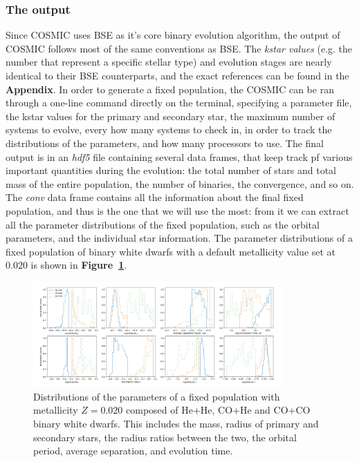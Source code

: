 \subsubsection{The output}
Since COSMIC uses BSE as it’s core binary evolution algorithm, the output of COSMIC follows most of the same conventions as BSE. The \textit{kstar values} (e.g. the number that represent a specific stellar type) and evolution stages are nearly identical to their BSE counterparts, and the exact references can be found in the \textbf{Appendix}.
In order to generate a fixed population, the COSMIC can be ran through a one-line command directly on the terminal, specifying a parameter file, the kstar values for the primary and secondary star, the maximum number of systems to evolve, every how many systems to check in, in order to track the distributions of the parameters, and how many processors to use.
The final output is in an \textit{hdf5} file containing several data frames, that keep track pf various important quantities during the evolution: the total number of stars and total mass of the entire population, the number of binaries, the convergence, and so on. 
The \textit{conv} data frame contains all the information about the final fixed population, and thus is the one that we will use the most: from it we can extract all the parameter distributions of the fixed population, such as the orbital parameters, and the individual star information.
The parameter distributions of a fixed population of binary white dwarfs with a default metallicity value set at $0.020$ is shown in \textbf{Figure~\ref{fig: first fixed pop distributions}}.
\begin{figure}[ht!]
    \begin{center}
        \includegraphics[width=0.85\textwidth]{images/first_fixed_params_distr.jpg}
    \end{center}
    \caption{Distributions of the parameters of a fixed population with metallicity $Z=0.020$ composed of He+He, CO+He and CO+CO binary white dwarfs. This includes the mass, radius of primary and secondary stars, the radius ratios between the two, the orbital period, average separation, and evolution time.}\label{fig: first fixed pop distributions}
\end{figure}



